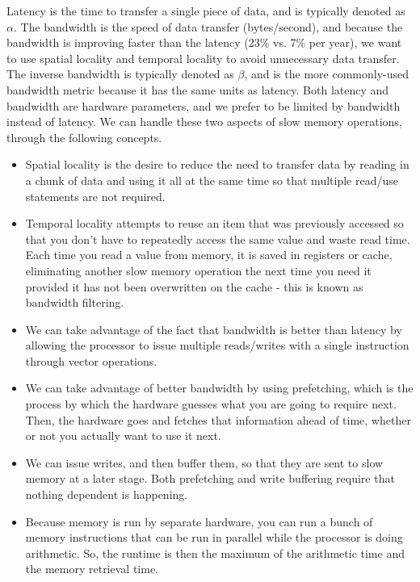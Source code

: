 \documentclass[10pt]{article}
\begin{document}
\begin{flushleft}
Latency is the time to transfer a single piece of data, and is typically denoted as \(\alpha\). The bandwidth is the speed of data transfer (bytes/second), and because the bandwidth is improving faster than the latency (23\% vs. 7\% per year), we want to use spatial locality and temporal locality to avoid unnecessary data transfer. The inverse bandwidth is typically denoted as \(\beta\), and is the more commonly-used bandwidth metric because it has the same units as latency. Both latency and bandwidth are hardware parameters, and we prefer to be limited by bandwidth instead of latency. We can handle these two aspects of slow memory operations, through the following concepts.

\begin{itemize}
\item Spatial locality is the desire to reduce the need to transfer data by reading in a chunk of data and using it all at the same time so that multiple read/use statements are not required.
\item Temporal locality attempts to reuse an item that was previously accessed so that you don't have to repeatedly access the same value and waste read time. Each time you read a value from memory, it is saved in registers or cache, eliminating another slow memory operation the next time you need it provided it has not been overwritten on the cache - this is known as bandwidth filtering.
\item We can take advantage of the fact that bandwidth is better than latency by allowing the processor to issue multiple reads/writes with a single instruction through vector operations.
\item We can take advantage of better bandwidth by using prefetching, which is the process by which the hardware guesses what you are going to require next. Then, the hardware goes and fetches that information ahead of time, whether or not you actually want to use it next.
\item We can issue writes, and then buffer them, so that they are sent to slow memory at a later stage. Both prefetching and write buffering require that nothing dependent is happening.
\item Because memory is run by separate hardware, you can run a bunch of memory instructions that can be run in parallel while the processor is doing arithmetic. So, the runtime is then the maximum of the arithmetic time and the memory retrieval time.
\end{itemize}


\end{flushleft}
\end{document}
